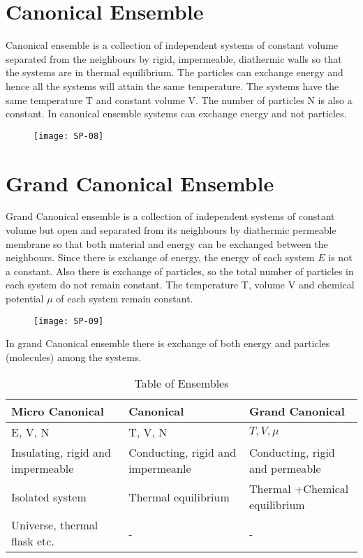 \section{Canonical Ensemble}
Canonical ensemble is a collection of independent systems of constant volume separated from the neighbours by rigid, impermeable, diathermic walls so that the systems are in thermal equilibrium. The particles can exchange energy and hence all the systems will attain the same temperature. The systems have the same temperature $\mathrm{T}$ and constant volume $\mathrm{V}$. The number of particles $\mathrm{N}$ is also a constant. In canonical ensemble systems can exchange energy and not particles. 
\begin{figure}[H]
	\centering
	\texttt{[image: SP-08]}
\end{figure}
\section{Grand Canonical Ensemble}
Grand Canonical ensemble is a collection of independent systems of constant volume but open and separated from its neighbours by diathermic permeable membrane so that both material and energy can be exchanged between the neighbours. Since there is exchange of energy, the energy of each system $E$ is not a constant. Also there is exchange of particles, so the total number of particles in each system do not remain constant. The temperature T, volume $\mathrm{V}$ and chemical potential $\mu$ of each system remain constant. 
\begin{figure}[H]
	\centering
	\texttt{[image: SP-09]}
\end{figure}
In grand Canonical ensemble there is exchange of both energy and particles (molecules) among the systems.



\begin{table}[H]
	\centering
	\renewcommand*{\arraystretch}{1.5}
\begin{tabular}{|p{5cm}|p{5cm}|p{5cm}|}
	\hline
	\textbf{Micro Canonical}&\textbf{Canonical}&\textbf{Grand Canonical}\\\hline
	E, V, N&T, V, N&$T, V, \mu $ \\\hline
	Insulating, rigid and impermeable&Conducting, rigid and impermeanle&Conducting, rigid and permeable \\\hline
	Isolated system &Thermal equilibrium &  Thermal +Chemical equilibrium \\\hline
	Universe, thermal flask etc.&-&-\\\hline
\end{tabular}
\caption{Table of Ensembles}
\end{table}


